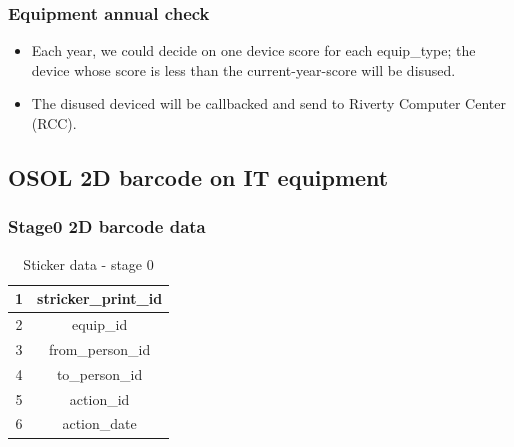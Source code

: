 \documentclass[a4paper,11pt]{article}
\begin{document}
\subsubsection{Equipment annual check}
	\begin{itemize}
		\item Each year, we could decide on one device score for each equip\_type; the device whose score is less than the current-year-score will be disused.
		\item The disused deviced will be callbacked and send to Riverty Computer Center (RCC).
	\end{itemize}
\subsection{OSOL 2D barcode on IT equipment}

\subsubsection {Stage0 2D barcode data}
\begin{table}[h!]
\begin{center}
	\begin{tabular}{ | c | c | }
		\hline
		1 & stricker\_print\_id \\ 
		\hline
		2 & equip\_id  \\  
		\hline
		3 & from\_person\_id \\
		\hline
		4 & to\_person\_id \\ 
		\hline
		5 &  action\_id \\  
		\hline
		6 & action\_date \\
		\hline
	\end{tabular}
	\caption{Sticker data \-- stage 0}
	\label{table:sticker_data_stage_0}
\end{center}
\end{table}
\end{document}
